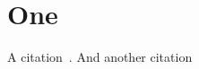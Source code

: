 
\chapter{One}
\label{cap:one}

A citation~\citep{Czakon:2022dwk}. And another citation~\citep{Czakon:2023kqm}

\lipsum[4]
